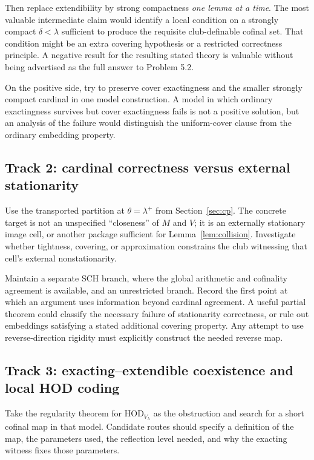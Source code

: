 \documentclass[11pt,letterpaper]{article}
\theoremstyle{definition}
\newcommand{\HOD}{\mathrm{HOD}}
\begin{document}
Then replace extendibility by strong compactness \emph{one lemma at a time}. The most valuable intermediate claim would identify a local condition on a strongly compact $\delta<\lambda$ sufficient to produce the requisite club-definable cofinal set. That condition might be an extra covering hypothesis or a restricted correctness principle. A negative result for the resulting stated theory is valuable without being advertised as the full answer to Problem 5.2.

On the positive side, try to preserve cover exactingness and the smaller strongly compact cardinal in one model construction. A model in which ordinary exactingness survives but cover exactingness fails is not a positive solution, but an analysis of the failure would distinguish the uniform-cover clause from the ordinary embedding property.

\subsection{Track 2: cardinal correctness versus external stationarity}

Use the transported partition at $\theta=\lambda^+$ from Section~\ref{sec:cp}. The concrete target is not an unspecified ``closeness'' of $M$ and $V$; it is an externally stationary image cell, or another package sufficient for Lemma~\ref{lem:collision}. Investigate whether tightness, covering, or approximation constrains the club witnessing that cell's external nonstationarity.

Maintain a separate SCH branch, where the global arithmetic and cofinality agreement is available, and an unrestricted branch. Record the first point at which an argument uses information beyond cardinal agreement. A useful partial theorem could classify the necessary failure of stationarity correctness, or rule out embeddings satisfying a stated additional covering property. Any attempt to use reverse-direction rigidity must explicitly construct the needed reverse map.

\subsection{Track 3: exacting--extendible coexistence and local HOD coding}

Take the regularity theorem for $\HOD_{V_\lambda}$ as the obstruction and search for a short cofinal map in that model. Candidate routes should specify a definition of the map, the parameters used, the reflection level needed, and why the exacting witness fixes those parameters.
\end{document}

